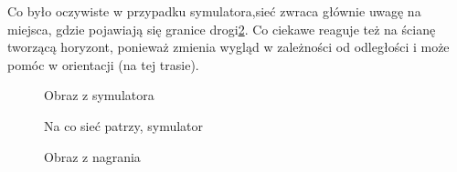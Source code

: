 Co było oczywiste w przypadku symulatora,sieć zwraca głównie uwagę na miejsca,
gdzie pojawiają się granice drogi\ref{sim_act}. Co ciekawe reaguje też na ścianę
tworzącą horyzont, ponieważ zmienia wygląd w zależności od odległości i może
pomóc w orientacji (na tej trasie).
\begin{figure}
  \centering
  \label{sim_img}
  \caption{Obraz z symulatora}
\end{figure}
\begin{figure}
  \centering
  \label{sim_act}
  \caption{Na co sieć patrzy, symulator}
\end{figure}
\begin{figure}
  \centering
  \label{real_img}
  \caption{Obraz z nagrania}
\end{figure}
